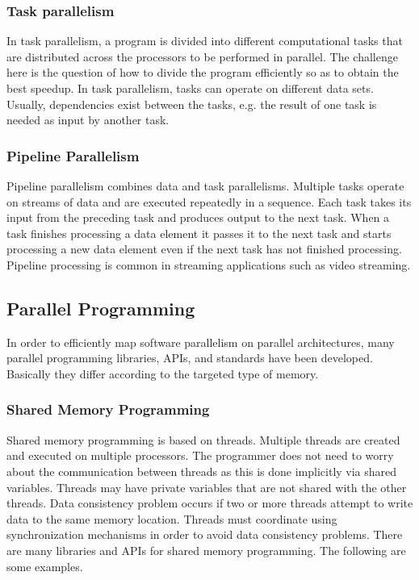 \subsubsection{Task parallelism}
In task parallelism, a program is divided into different computational tasks that are distributed across the processors to be performed in parallel. The challenge here is the question of how to divide the program efficiently so as to obtain the best speedup. In task parallelism, tasks can operate on different data sets. Usually, dependencies exist between the tasks, e.g. the result of one task is needed as input by another task.

\subsubsection{Pipeline Parallelism}

Pipeline parallelism combines data and task parallelisms. Multiple tasks operate on streams of data and are executed repeatedly in a sequence. Each task takes its input from the preceding task and produces output to the next task. When a task finishes processing a data element it passes it to the next task and starts processing a new data element even if the next task has not finished processing. Pipeline processing is common in streaming applications such as video streaming. 

\subsection{Parallel Programming}

In order to efficiently map software parallelism on parallel architectures, many parallel programming libraries, APIs, and standards have been developed. Basically they differ according to the targeted type of memory.

\subsubsection{Shared Memory Programming}

Shared memory programming is based on threads. Multiple threads are created and executed on multiple processors. The programmer does not need to worry about the communication between threads as this is done implicitly via shared variables. Threads may have private variables that are not shared with the other threads. Data consistency problem occurs if two or more threads attempt to write data to the same memory location. Threads must coordinate using synchronization mechanisms in order to avoid data consistency problems. There are many libraries and APIs for shared memory programming. The following are some examples.

